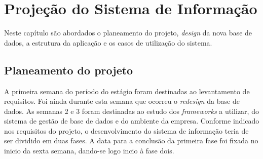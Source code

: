 \chapter{Projeção do Sistema de Informação} 
\label{cap:4}
Neste capítulo são abordados o planeamento do projeto, \textit{design} da nova base de dados, a estrutura da aplicação e os casos de utilização do sistema.

\section{Planeamento do projeto}
A primeira semana do período do estágio foram destinadas ao levantamento de requisitos. Foi ainda durante esta semana que ocorreu o \textit{redesign} da base de dados.
As semanas 2 e 3 foram destinadas ao estudo dos \textit{frameworks} a utilizar, do sistema de gestão de base de dados e do ambiente da empresa.
Conforme indicado nos requisitos do projeto, o desenvolvimento do sistema de informação teria de ser dividido em duas fases. A data para a conclusão da primeira fase foi fixada no inicio da sexta semana, dando-se logo incio à fase dois.

